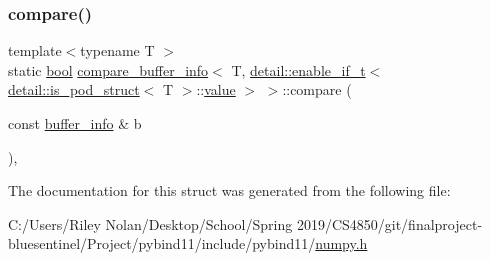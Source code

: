 \subsubsection{\texorpdfstring{compare()}{compare()}}
{\footnotesize\ttfamily template$<$typename T $>$ \\
static \mbox{\hyperlink{asdl_8h_af6a258d8f3ee5206d682d799316314b1}{bool}} \mbox{\hyperlink{structcompare__buffer__info}{compare\+\_\+buffer\+\_\+info}}$<$ T, \mbox{\hyperlink{detail_2common_8h_a012819c9e8b5e04872a271f50f8b8196}{detail\+::enable\+\_\+if\+\_\+t}}$<$ \mbox{\hyperlink{numpy_8h_ae000b26e650bc54d99e9a22109b58515}{detail\+::is\+\_\+pod\+\_\+struct}}$<$ T $>$\+::\mbox{\hyperlink{_s_d_l__opengl__glext_8h_a8ad81492d410ff2ac11f754f4042150f}{value}} $>$ $>$\+::compare (\begin{DoxyParamCaption}\item[{const \mbox{\hyperlink{structbuffer__info}{buffer\+\_\+info}} \&}]{b }\end{DoxyParamCaption})\hspace{0.3cm}{\ttfamily [inline]}, {\ttfamily [static]}}



The documentation for this struct was generated from the following file\+:\begin{DoxyCompactItemize}
\item 
C\+:/\+Users/\+Riley Nolan/\+Desktop/\+School/\+Spring 2019/\+C\+S4850/git/finalproject-\/bluesentinel/\+Project/pybind11/include/pybind11/\mbox{\hyperlink{numpy_8h}{numpy.\+h}}\end{DoxyCompactItemize}

